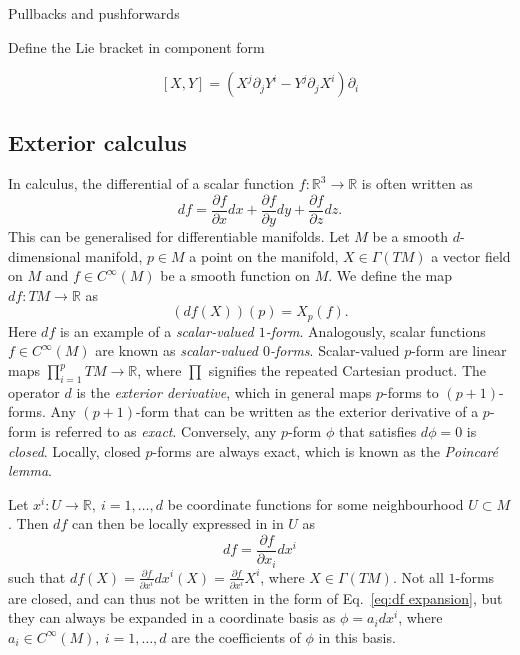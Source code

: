 Pullbacks and pushforwards

Define the Lie bracket in component form

\begin{equation} \label{eq:lie bracket in component form}
[X, Y] = (X^j \partial_j Y^i - Y^j \partial_j X^i) \partial_i
\end{equation}

\subsection{Exterior calculus}

In calculus, the differential of a scalar function $f : \mathbb{R}^3 \to \mathbb{R}$ is often written as
\begin{equation}
df = \frac{\partial f}{\partial x} d x + \frac{\partial f}{\partial y} d y + \frac{\partial f}{\partial z} d z.
\end{equation}
This can be generalised for differentiable manifolds. Let $M$ be a smooth $d$-dimensional manifold, $p \in M$ a point on the manifold, $X \in \Gamma(TM)$ a vector field on $M$ and $f \in C^\infty(M)$ be a smooth function on $M$. We define the map $df : TM \to \mathbb{R}$ as
\begin{equation} \label{eq:df action}
(df(X))(p) = X_p(f).
\end{equation}
Here $df$ is an example of a \textit{scalar-valued $1$-form}. Analogously, scalar functions $f \in C^\infty(M)$ are known as \textit{scalar-valued $0$-forms}. Scalar-valued $p$-form are linear maps $\prod_{i=1}^p TM \to \mathbb{R}$, where $\prod$ signifies the repeated Cartesian product. The operator $d$ is the \textit{exterior derivative}, which in general maps $p$-forms to $(p+1)$-forms. Any $(p+1)$-form that can be written as the exterior derivative of a $p$-form is referred to as \textit{exact}. Conversely, any $p$-form $\phi$ that satisfies $d \phi = 0$ is \textit{closed}. Locally, closed $p$-forms are always exact, which is known as the \textit{Poincaré lemma}. 
 
Let $x^i : U \to \mathbb{R},\ i=1,\dots,d$ be coordinate functions for some neighbourhood $U \subset M$. Then $df$ can then be locally expressed in in $U$ as
\begin{equation} \label{eq:df expansion}
df = \frac{\partial f}{\partial x_i} d x^i
\end{equation}
such that $df(X) = \frac{\partial f}{\partial x^i} dx^i(X) = \frac{\partial f}{\partial x^i} X^i$, where $X \in \Gamma(TM)$. Not all $1$-forms are closed, and can thus not be written in the form of Eq.~\ref{eq:df expansion}, but they can always be expanded in a coordinate basis as $\phi = a_i dx^i$, where $a_i \in C^\infty(M),\ i=1,\dots,d$ are the coefficients of $\phi$ in this basis.

